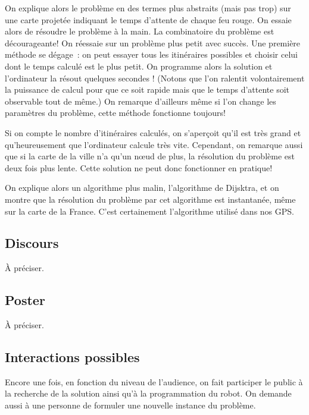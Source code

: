 \documentclass[11pt,a4paper]{article}
\begin{document}
On explique alors le problème en des termes plus abstraits (mais pas
trop) sur une carte projetée indiquant le temps d'attente de chaque
feu rouge. On essaie alors de résoudre le problème à la main. La
combinatoire du problème est décourageante! On réessaie sur un
problème plus petit avec succès. Une première méthode se dégage~: on
peut essayer tous les itinéraires possibles et choisir celui dont le
temps calculé est le plus petit. On programme alors la solution et
l'ordinateur la résout quelques secondes ! (Notons que l'on ralentit
volontairement la puissance de calcul pour que ce soit rapide mais que le
temps d'attente soit observable tout de même.) On remarque d'ailleurs
même si l'on change les paramètres du problème, cette méthode
fonctionne toujours! 

Si on compte le nombre d'itinéraires calculés, on s'aperçoit qu'il est
très grand et qu'heureusement que l'ordinateur calcule très vite.
Cependant, on remarque aussi que si la carte de la ville n'a qu'un
n{\oe}ud de plus, la résolution du problème est deux fois plus
lente. Cette solution ne peut donc fonctionner en pratique!

On explique alors un algorithme plus malin, l'algorithme de Dijsktra,
et on montre que la résolution du problème par cet algorithme est
instantanée, même sur la carte de la France. C'est certainement
l'algorithme utilisé dans nos GPS.

\subsection{Discours}

À préciser. 

\subsection{Poster}

À préciser. 

\subsection{Interactions possibles}

Encore une fois, en fonction du niveau de l'audience, on fait
participer le public à la recherche de la solution ainsi qu'à 
la programmation du robot. On demande aussi à une personne
de formuler une nouvelle instance du problème. 
\end{document}

